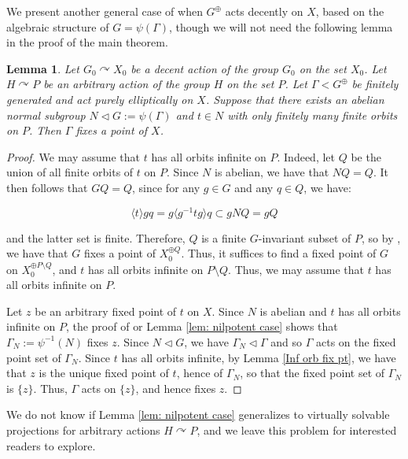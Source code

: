 \documentclass[12pt]{article}
\newtheorem{lem}[thm]{Lemma}
\theoremstyle{definition}
\begin{document}
We present another general case of when $G^{\oplus}$ acts decently on $X$, based on the algebraic structure of $G = \psi(\Gamma)$, though we will not need the following lemma in the proof of the main theorem. 

\begin{lem}
    \label{normal nilpotent}
    Let $G_0 \curvearrowright X_0$ be a decent action of the group $G_0$ on the set $X_0$. Let $H \curvearrowright P$ be an arbitrary action of the group $H$ on the set $P$. Let $\Gamma < G^{\oplus}$ be finitely generated and act purely elliptically on $X$. Suppose that there exists an abelian normal subgroup $N \triangleleft G:= \psi(\Gamma)$ and $t \in N$ with only finitely many finite orbits on $P$. Then $\Gamma$ fixes a point of $X$. 
    
\end{lem}

\begin{proof}
    
    We may assume that $t$ has all orbits infinite on $P$. Indeed, let $Q$ be the union of all finite orbits of $t$ on $P$. Since $N$ is abelian, we have that $NQ = Q$. It then follows that $GQ = Q$, since for any $g \in G$ and any $q \in Q$, we have: 

    $$\langle t \rangle g q = g \langle g^{-1} t g \rangle q \subset gNQ = gQ$$

    and the latter set is finite. Therefore, $Q$ is a finite $G$-invariant subset of $P$, so by \cite[Remark 4.2]{Algebraic}, we have that $G$ fixes a point of $X_0^{\oplus Q}$. Thus, it suffices to find a fixed point of $G$ on $X_0^{\oplus P \setminus Q}$, and $t$ has all orbits infinite on $P \setminus Q$. Thus, we may assume that $t$ has all orbits infinite on $P$. 
    
    Let $z$ be an arbitrary fixed point of $t$ on $X$. Since $N$ is abelian and $t$ has all orbits infinite on $P$, the proof of \cite[Lemma 4.7]{Algebraic} or Lemma \ref{lem: nilpotent case} shows that $\Gamma_N := \psi^{-1}(N)$ fixes $z$. Since $N \triangleleft G$, we have $\Gamma_N \triangleleft \Gamma$ and so $\Gamma$ acts on the fixed point set of $\Gamma_N$. Since $t$ has all orbits infinite, by Lemma \ref{Inf orb fix pt}, we have that $z$ is the unique fixed point of $t$, hence of $\Gamma_N$, so that the fixed point set of $\Gamma_N$ is $\{z\}$. Thus, $\Gamma$ acts on $\{z\}$, and hence fixes $z$. 
\end{proof}

We do not know if Lemma \ref{lem: nilpotent case} generalizes to virtually solvable projections for arbitrary actions $H \curvearrowright P$, and we leave this problem for interested readers to explore. 
\end{document}
